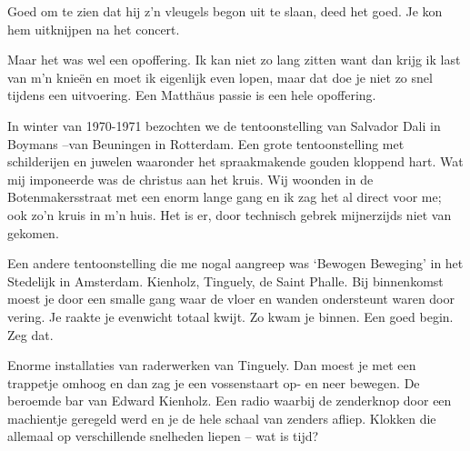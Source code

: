 \documentclass[12pt,twoside, openright]{memoir}
\begin{document}
Goed om te zien dat hij z’n vleugels begon uit te slaan, deed het goed. Je kon hem uitknijpen na het concert.  

Maar het was wel een opoffering. Ik kan niet zo lang zitten want dan krijg ik last van m’n knieën en moet ik eigenlijk even lopen, maar dat doe je niet zo snel tijdens een uitvoering. Een Matthäus passie is een hele opoffering.

In winter van 1970-1971 bezochten we de tentoonstelling van Salvador Dali in Boymans –van Beuningen in Rotterdam. Een grote tentoonstelling met schilderijen en juwelen waaronder het spraakmakende gouden kloppend hart. Wat mij imponeerde was de christus aan het kruis. Wij woonden in de Botenmakersstraat met een enorm lange gang en ik zag het al direct voor me; ook zo’n kruis in m’n huis. Het is er, door technisch gebrek mijnerzijds niet van gekomen.

Een andere tentoonstelling die me nogal aangreep was ‘Bewogen Beweging’ in het Stedelijk in Amsterdam. Kienholz, Tinguely, de Saint Phalle. Bij binnenkomst moest je door een smalle gang waar de vloer en wanden ondersteunt waren door vering. Je raakte je evenwicht totaal kwijt. Zo kwam je binnen. Een goed begin. Zeg dat.

Enorme installaties van raderwerken van Tinguely. Dan moest je met een trappetje omhoog en dan zag je een vossenstaart op- en neer bewegen. De beroemde bar van Edward Kienholz. Een radio waarbij de zenderknop door een machientje geregeld werd en je de hele schaal van zenders afliep. Klokken die allemaal op verschillende snelheden liepen – wat is tijd? 
\end{document}
